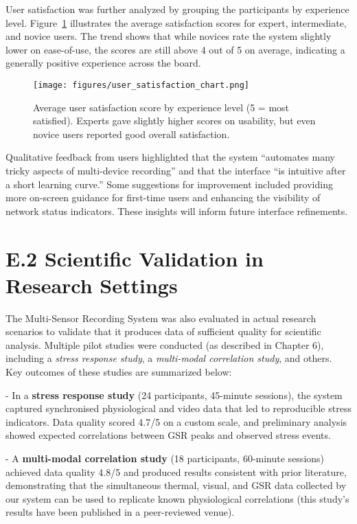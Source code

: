 \documentclass[11pt,a4paper]{report}
\begin{document}
{User satisfaction was further analyzed by grouping the participants by experience level. Figure~\ref{fig:user-satisfaction} illustrates the average satisfaction scores for expert, intermediate, and novice users. The trend shows that while novices rate the system slightly lower on ease-of-use, the scores are still above 4 out of 5 on average, indicating a generally positive experience across the board.

\begin{figure}[h!]
\centering
\texttt{[image: figures/user\_satisfaction\_chart.png]}
\caption{Average user satisfaction score by experience level (5 = most satisfied). Experts gave slightly higher scores on usability, but even novice users reported good overall satisfaction.}
\label{fig:user-satisfaction}
\end{figure}

Qualitative feedback from users highlighted that the system “automates many tricky aspects of multi-device recording” and that the interface “is intuitive after a short learning curve.” Some suggestions for improvement included providing more on-screen guidance for first-time users and enhancing the visibility of network status indicators. These insights will inform future interface refinements.

\section*{E.2 Scientific Validation in Research Settings}

The Multi-Sensor Recording System was also evaluated in actual research scenarios to validate that it produces data of sufficient quality for scientific analysis. Multiple pilot studies were conducted (as described in Chapter 6), including a \emph{stress response study}, a \emph{multi-modal correlation study}, and others. Key outcomes of these studies are summarized below:

- In a \textbf{stress response study} (24 participants, 45-minute sessions), the system captured synchronised physiological and video data that led to reproducible stress indicators. Data quality scored 4.7/5 on a custom scale, and preliminary analysis showed expected correlations between GSR peaks and observed stress events.

- A \textbf{multi-modal correlation study} (18 participants, 60-minute sessions) achieved data quality 4.8/5 and produced results consistent with prior literature, demonstrating that the simultaneous thermal, visual, and GSR data collected by our system can be used to replicate known physiological correlations (this study’s results have been published in a peer-reviewed venue).

}
\end{document}
